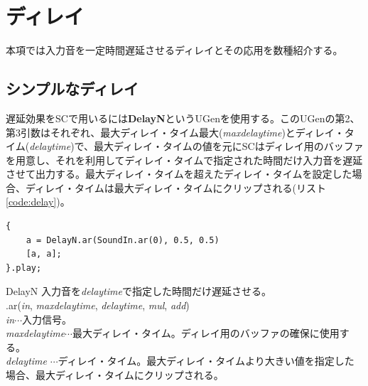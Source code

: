 \documentclass{jsarticle}
\begin{document}
\section{ディレイ}
本項では入力音を一定時間遅延させるディレイとその応用を数種紹介する。

\subsection{シンプルなディレイ}

遅延効果をSCで用いるには{\bf DelayN}というUGenを使用する。このUGenの第2、第3引数はそれぞれ、最大ディレイ・タイム最大({\it maxdelaytime})とディレイ・タイム({\it delaytime})で、最大ディレイ・タイムの値を元にSCはディレイ用のバッファを用意し、それを利用してディレイ・タイムで指定された時間だけ入力音を遅延させて出力する。最大ディレイ・タイムを超えたディレイ・タイムを設定した場合、ディレイ・タイムは最大ディレイ・タイムにクリップされる(リスト\ref{code:delay})。
\begin{lstlisting}[caption=ディレイ, label=code:delay]
{
	a = DelayN.ar(SoundIn.ar(0), 0.5, 0.5)
	[a, a];
}.play;
\end{lstlisting}

\begin{itembox}[l]{DelayN}
	{\footnotesize 
	入力音を{\it delaytime}で指定した時間だけ遅延させる。\\
	.ar({\it in}, {\it maxdelaytime}, {\it delaytime}, {\it mul}, {\it add})\\
	{\it in}$\cdots$入力信号。\\
	{\it maxdelaytime}$\cdots$最大ディレイ・タイム。ディレイ用のバッファの確保に使用する。\\
	{\it delaytime} $\cdots$ディレイ・タイム。最大ディレイ・タイムより大きい値を指定した場合、最大ディレイ・タイムにクリップされる。
	}
\end{itembox}
\end{document}
